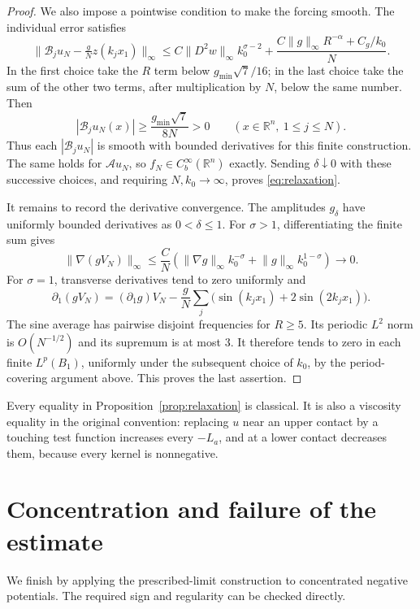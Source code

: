 \documentclass[11pt]{article}
\newcommand{\R}{\mathbb R}
\newcommand{\A}{\mathcal A}
\newcommand{\B}{\mathcal B}
\newcommand{\norm}[1]{\lVert#1\rVert}
\newcommand{\Cb}{C_b^\infty(\R^n)}
\theoremstyle{remark}
\numberwithin{equation}{section}
\begin{document}
\begin{proof}
We also impose a pointwise condition to make the forcing smooth.
The individual error satisfies
\[
 \norm{\B_ju_N-\tfrac gN z(k_jx_1)}_\infty
 \le C\norm{D^2w}_\infty k_0^{\sigma-2}
       +\frac{C\norm g_\infty R^{-\alpha}+C_g/k_0}{N}.
\]
In the first choice take the $R$ term below $g_{\min}\sqrt7/16$;
in the last choice take the sum of the other two terms, after
multiplication by $N$, below the same number. Then
\[
 |\B_ju_N(x)|\ge \frac{g_{\min}\sqrt7}{8N}>0
       \qquad (x\in\R^n,\ 1\le j\le N).
\]
Thus each $|\B_ju_N|$ is smooth with bounded derivatives for this finite
construction. The same holds for $\A u_N$, so $f_N\in\Cb$ exactly.
Sending $\delta\downarrow0$ with these successive choices, and requiring
$N,k_0\to\infty$, proves \eqref{eq:relaxation}.

It remains to record the derivative convergence. The amplitudes
$g_\delta$ have uniformly bounded derivatives as $0<\delta\le1$.
For $\sigma>1$, differentiating the finite sum gives
\[
 \norm{\nabla(gV_N)}_\infty
 \le\frac C N\left(\norm{\nabla g}_\infty k_0^{-\sigma}
                   +\norm g_\infty k_0^{1-\sigma}\right)\to0.
\]
For $\sigma=1$, transverse derivatives tend to zero uniformly and
\[
 \partial_1(gV_N)=(\partial_1g)V_N
 -\frac gN\sum_j\bigl(\sin(k_jx_1)+2\sin(2k_jx_1)\bigr).
\]
The sine average has pairwise disjoint frequencies for $R\ge5$.
Its periodic $L^2$ norm is $O(N^{-1/2})$ and its supremum is at most $3$.
It therefore tends to zero in each finite $L^p(B_1)$, uniformly under
the subsequent choice of $k_0$, by the period-covering argument above.
This proves the last assertion.
\end{proof}

Every equality in Proposition~\ref{prop:relaxation} is classical. It is
also a viscosity equality in the original convention: replacing $u$ near
an upper contact by a touching test function increases every $-L_a$, and
at a lower contact decreases them, because every kernel is nonnegative.

\section{Concentration and failure of the estimate}\label{sec:concentration}
We finish by applying the prescribed-limit construction to concentrated
negative potentials. The required sign and regularity can be checked
directly.
\end{document}
